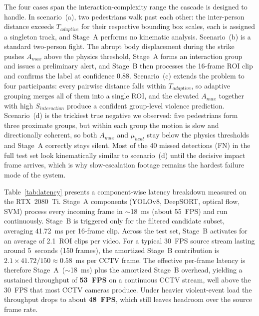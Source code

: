 \documentclass[conference]{IEEEtran}
\begin{document}
The four cases span the interaction-complexity range the cascade is designed to handle. In scenario~(a), two pedestrians walk past each other: the inter-person distance exceeds $T_{adaptive}$ for their respective bounding box scales, each is assigned a singleton track, and Stage~A performs no kinematic analysis. Scenario~(b) is a standard two-person fight. The abrupt body displacement during the strike pushes $A_{max}$ above the physics threshold, Stage~A forms an interaction group and issues a preliminary alert, and Stage~B then processes the 16-frame ROI clip and confirms the label at confidence 0.88. Scenario~(c) extends the problem to four participants: every pairwise distance falls within $T_{adaptive}$, so adaptive grouping merges all of them into a single ROI, and the elevated $A_{max}$ together with high $S_{interaction}$ produce a confident group-level violence prediction. Scenario~(d) is the trickiest true negative we observed: five pedestrians form three proximate groups, but within each group the motion is slow and directionally coherent, so both $A_{max}$ and $\mu_{heat}$ stay below the physics thresholds and Stage~A correctly stays silent. Most of the 40 missed detections (FN) in the full test set look kinematically similar to scenario~(d) until the decisive impact frame arrives, which is why slow-escalation footage remains the hardest failure mode of the system.

Table~\ref{tab:latency} presents a component-wise latency breakdown measured on the RTX~2080~Ti. Stage~A components (YOLOv8, DeepSORT, optical flow, SVM) process every incoming frame in $\sim$18~ms (about 55~FPS) and run continuously. Stage~B is triggered only for the filtered candidate subset, averaging 41.72~ms per 16-frame clip. Across the test set, Stage~B activates for an average of 2.1~ROI clips per video. For a typical 30~FPS source stream lasting around 5~seconds (150 frames), the amortized Stage~B contribution is $2.1 \times 41.72 / 150 \approx 0.58$~ms per CCTV frame. The effective per-frame latency is therefore Stage~A~($\sim$18~ms) plus the amortized Stage~B overhead, yielding a sustained throughput of \textbf{53~FPS} on a continuous CCTV stream, well above the 30~FPS that most CCTV cameras produce. Under heavier violent-event load the throughput drops to about \textbf{48~FPS}, which still leaves headroom over the source frame rate.
\end{document}
